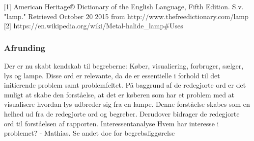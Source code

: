 [1] American Heritage® Dictionary of the English Language, Fifth Edition. S.v. "lamp." Retrieved October 20 2015 from http://www.thefreedictionary.com/lamp
[2] https://en.wikipedia.org/wiki/Metal-halide_lamp#Uses

\subsubsection{Afrunding}
Der er nu skabt kendskab til begreberne: Køber, visualiering, forbruger, sælger,  lys og lampe. Disse ord er relevante, da de er essentielle i forhold til det initierende problem samt problemfeltet. På baggrund af de redegjorte ord er det muligt at skabe den forståelse, at det er køberen som har et problem med at visualisere hvordan lys udbreder sig fra en lampe. Denne forståelse skabes som en helhed ud fra de redegjorte ord og begreber. 
Derudover bidrager de redegjorte ord til forståelsen af rapporten.
Interessentanalyse
Hvem har interesse i problemet? - Mathias. Se andet doc for begrebsliggørelse
 


